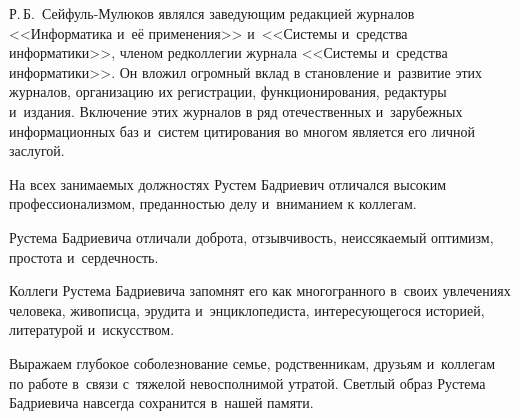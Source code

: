      Р.\,Б.~Сейфуль-Мулюков являлся заведующим редакцией журналов <<Информатика и~её применения>> и~<<Системы и~средства информатики>>, членом редколлегии журнала <<Системы и~средства информатики>>. Он вложил огромный вклад в становление и~развитие этих журналов, организацию их регистрации, функционирования, редактуры и~издания. Включение этих журналов в ряд отечественных и~зарубежных информационных баз и~систем цитирования во многом является его личной заслугой.
     
     На всех занимаемых должностях Рустем Бадриевич отличался высоким профессионализмом, преданностью делу и~вниманием к коллегам.
     
     \thispagestyle{empty}
     
     Рустема Бадриевича отличали доброта, отзывчивость, неиссякаемый
      оптимизм, простота и~сердечность.
     
     Коллеги Рустема Бадриевича запомнят его как многогранного в~своих увлечениях человека, живописца,
     эрудита и~энциклопедиста, интересующегося историей, литературой и~искусством.
     
     Выражаем глубокое
     соболезнование семье, родственникам, друзьям и~коллегам по работе в~связи с~тяжелой невосполнимой утратой.
     Светлый образ Рустема Бадриевича навсегда сохранится в~нашей памяти.
     

      